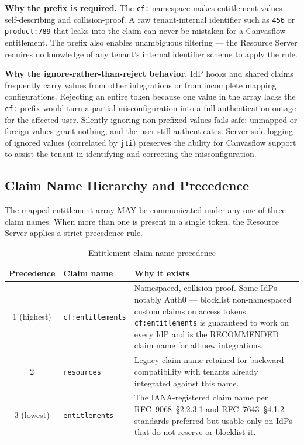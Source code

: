 \textbf{Why the prefix is required.} The \texttt{cf:} namespace makes entitlement values
self-describing and collision-proof. A raw tenant-internal identifier such as \texttt{456}
or \texttt{product:789} that leaks into the claim can never be mistaken for a Canvasflow
entitlement. The prefix also enables unambiguous filtering --- the Resource Server requires
no knowledge of any tenant's internal identifier scheme to apply the rule.

\textbf{Why the ignore-rather-than-reject behavior.} IdP hooks and shared claims
frequently carry values from other integrations or from incomplete mapping configurations.
Rejecting an entire token because one value in the array lacks the \texttt{cf:} prefix
would turn a partial misconfiguration into a full authentication outage for the affected
user. Silently ignoring non-prefixed values fails safe: unmapped or foreign values grant
nothing, and the user still authenticates. Server-side logging of ignored values
(correlated by \texttt{jti}) preserves the ability for Canvasflow support to assist the
tenant in identifying and correcting the misconfiguration.

\subsection{Claim Name Hierarchy and Precedence}\label{sec:claim-name-hierarchy}

The mapped entitlement array MAY be communicated under any one of three claim names.
When more than one is present in a single token, the Resource Server applies a strict
precedence rule.




\begin{table}[htbp]
\centering
\begin{tabularx}{\textwidth}{@{}clX@{}}
\toprule
\textbf{Precedence} & \textbf{Claim name} & \textbf{Why it exists} \\
\midrule
1 (highest) & \texttt{cf:entitlements} &
  Namespaced, collision-proof. Some IdPs --- notably Auth0 --- blocklist non-namespaced
  custom claims on access tokens. \texttt{cf:entitlements} is guaranteed to work on
  every IdP and is the RECOMMENDED claim name for all new integrations. \\[6pt]
2 & \texttt{resources} &
  Legacy claim name retained for backward compatibility with tenants already integrated
  against this name. \\[6pt]
3 (lowest) & \texttt{entitlements} &
  The IANA-registered claim name per 
  \href{https://tools.ietf.org/html/rfc9068\#section-2.2.3.1}{RFC~9068~\S2.2.3.1} and 
  \href{https://tools.ietf.org/html/rfc7643\#section-4.1.2}{RFC~7643~\S4.1.2} ---
  standards-preferred but usable only on IdPs that do not reserve or blocklist it. \\
\bottomrule
\end{tabularx}
\caption{Entitlement claim name precedence}
\end{table}

